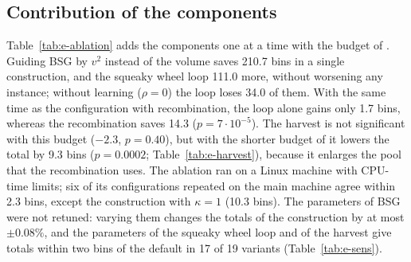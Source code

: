 \subsection{Contribution of the components}
\label{sec:e-ablation}

\begin{table}[t]
\centering
\small\setlength{\tabcolsep}{3pt}
\caption{Ablation on the 240 original instances (fixed orientation, $T=20$ s, $\tau=0.005$ s, three seeds). Each row
marked with + adds a component; rows marked with $\ast$ are controls. Diff., better/worse and $p$ (Wilcoxon signed-rank
test on the means per instance) compare each row with its reference: $\kappa=1$ and the squeaky wheel loop with the
construction, $\rho=0$ and $T=26$ with the squeaky wheel loop of $T=20$, the recombination with the squeaky wheel loop of
$T=26$ (same time), and the harvest with the recombination. Time: mean per instance.}
\label{tab:e-ablation}

\end{table}

Table~\ref{tab:e-ablation} adds the components one at a time with the budget of \cfgbal{}. Guiding BSG by $v^2$ instead
of the volume saves 210.7 bins in a single construction, and the squeaky wheel loop 111.0 more, without worsening any
instance; without learning ($\rho=0$) the loop loses 34.0 of them. With the same time as the configuration with
recombination, the loop alone gains only 1.7 bins, whereas the recombination saves 14.3 ($p=7\cdot 10^{-5}$). The harvest
is not significant with this budget ($-2.3$, $p=0.40$), but with the shorter budget of \cfgfast{} it lowers the total by
9.3 bins ($p=0.0002$; Table~\ref{tab:e-harvest}), because it enlarges the pool that the recombination uses. The ablation
ran on a Linux machine with CPU-time limits; six of its configurations repeated on the main machine agree within 2.3
bins, except the construction with $\kappa=1$ (10.3 bins). The parameters of BSG were not retuned: varying them changes the
totals of the construction by at most $\pm 0.08\%$, and the parameters of the squeaky wheel loop and of the harvest
give totals within two bins of the default in 17 of 19 variants (Table~\ref{tab:e-sens}).

